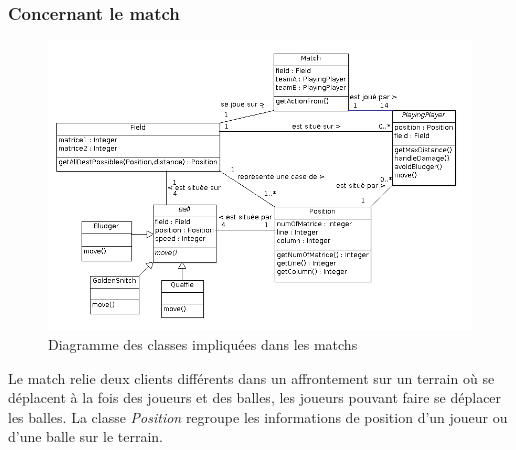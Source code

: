 \documentclass[a4paper,titlepage]{scrreprt}
\begin{document}
  \subsubsection{Concernant le match}
    \begin{figure}[H]
    \center
    \includegraphics[scale=0.4]{uml/class/Diagrammedeclassesmatch.png}
    \caption{Diagramme des classes impliquées dans les matchs}
    \end{figure}	
    Le match relie deux clients différents dans un affrontement sur un \gls{terrain} 
    où se déplacent à la fois des joueurs et des balles, les joueurs pouvant faire se déplacer les balles. La classe \emph{Position} regroupe les informations de position d'un joueur ou d'une balle sur le terrain.
\end{document}
